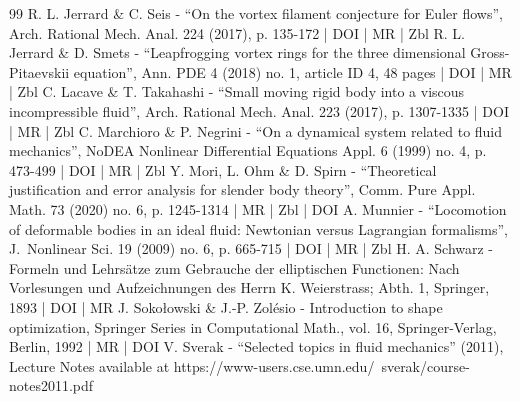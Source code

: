 \begin{thebibliography}{99}
R. L. Jerrard \& C. Seis - “On the vortex filament conjecture for Euler flows”, Arch. Rational Mech. Anal. 224 (2017), p. 135-172 | DOI | MR | Zbl
R. L. Jerrard \& D. Smets - “Leapfrogging vortex rings for the three dimensional Gross-Pitaevskii equation”, Ann. PDE 4 (2018) no. 1, article ID 4, 48 pages | DOI | MR | Zbl
C. Lacave \& T. Takahashi - “Small moving rigid body into a viscous incompressible fluid”, Arch. Rational Mech. Anal. 223 (2017), p. 1307-1335 | DOI | MR | Zbl
C. Marchioro \& P. Negrini - “On a dynamical system related to fluid mechanics”, NoDEA Nonlinear Differential Equations Appl. 6 (1999) no. 4, p. 473-499 | DOI | MR | Zbl
Y. Mori, L. Ohm \& D. Spirn - “Theoretical justification and error analysis for slender body theory”, Comm. Pure Appl. Math. 73 (2020) no. 6, p. 1245-1314 | MR | Zbl | DOI
A. Munnier - “Locomotion of deformable bodies in an ideal fluid: Newtonian versus Lagrangian formalisms”, J. Nonlinear Sci. 19 (2009) no. 6, p. 665-715 | DOI | MR | Zbl
H. A. Schwarz - Formeln und Lehrsätze zum Gebrauche der elliptischen Functionen: Nach Vorlesungen und Aufzeichnungen des Herrn K. Weierstrass; Abth. 1, Springer, 1893 | DOI | MR
J. Sokołowski \& J.-P. Zolésio - Introduction to shape optimization, Springer Series in Computational Math., vol. 16, Springer-Verlag, Berlin, 1992 | MR | DOI
V. Sverak - “Selected topics in fluid mechanics” (2011), Lecture Notes available at https://www-users.cse.umn.edu/~sverak/course-notes2011.pdf
\end{thebibliography}
